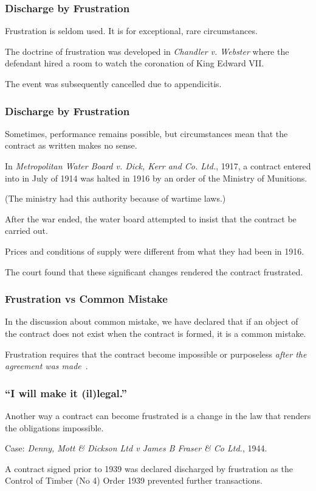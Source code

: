 \begin{frame}
\frametitle{Discharge by Frustration}

Frustration is seldom used. It is for exceptional, rare circumstances.

The doctrine of frustration was developed in \textit{Chandler v. Webster} where the
defendant hired a room to watch the coronation of King Edward VII.

The event was subsequently cancelled due to appendicitis.

\end{frame}



\begin{frame}
\frametitle{Discharge by Frustration}

Sometimes, performance remains possible, but circumstances mean that the contract as written makes no sense.

In \textit{Metropolitan Water Board v. Dick, Kerr and Co. Ltd.}, 1917, a contract entered into in July of 1914 was halted in 1916 by an order of the Ministry of Munitions.

(The ministry had this authority because of wartime laws.)

After the war ended, the water board attempted to insist that the contract be carried out.

Prices and conditions of supply were different from what they had been in 1916.

The court found that these significant changes rendered the contract frustrated.

\end{frame}



\begin{frame}
\frametitle{Frustration vs Common Mistake}

In the discussion about common mistake, we have declared that if an object of the contract does not exist when the contract is formed, it is a common mistake.

Frustration requires that the contract become impossible or purposeless \textit{after the agreement was made}~\cite{lba}.

\end{frame}



\begin{frame}
\frametitle{``I will make it (il)legal.''}

Another way a contract can become frustrated is a change in the law that renders the obligations impossible.

Case: \textit{Denny, Mott \& Dickson Ltd v James B Fraser \& Co Ltd.}, 1944.

A contract signed prior to 1939 was declared discharged by frustration as the Control of Timber (No 4) Order 1939 prevented further transactions.

\end{frame}



